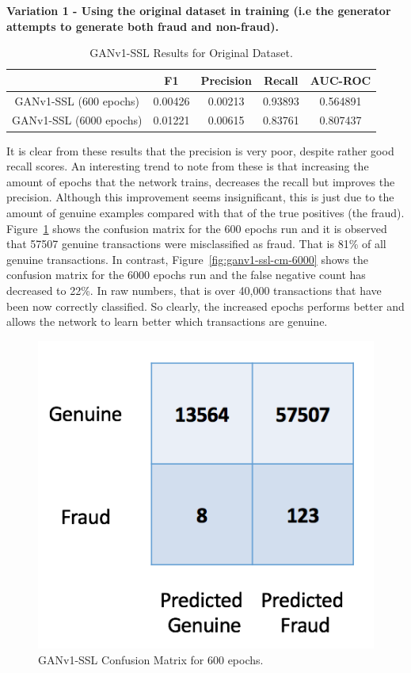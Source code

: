 \documentclass[12pt,a4paper,twoside]{report}
\begin{document}
\textbf{Variation 1 - Using the original dataset in training (i.e the generator attempts to generate both fraud and non-fraud).}

\begin{table}[H]  
  \centering
  \begin{tabular}{ccccc}
    \toprule
           		& F1 & Precision & Recall & AUC-ROC \\ \midrule
    GANv1-SSL (600 epochs) & 0.00426  &  0.00213 & 0.93893  & 0.564891 \\
    GANv1-SSL (6000 epochs) & 0.01221   &   0.00615 & 0.83761 & 0.807437  \\
   
   \bottomrule
 \end{tabular}
 \caption{GANv1-SSL Results for Original Dataset.}
\label{table:ganv1-ssl-original}
\end{table}

It is clear from these results that the precision is very poor, despite rather good recall scores. An interesting trend to note from these is that increasing the amount of epochs that the network trains, decreases the recall but improves the precision. Although this improvement seems insignificant, this is just due to the amount of genuine examples compared with that of the true positives (the fraud). Figure~\ref{fig:ganv1-ssl-cm-600} shows the confusion matrix for the 600 epochs run and it is observed that 57507 genuine transactions were misclassified as fraud. That is 81\% of all genuine transactions. In contrast, Figure~\ref{fig:ganv1-ssl-cm-6000} shows the confusion matrix for the 6000 epochs run and the false negative count has decreased to 22\%. In raw numbers, that is over 40,000 transactions that have been now correctly classified. So clearly, the increased epochs performs better and allows the network to learn better which transactions are genuine. 

\begin{figure}[H]
\centering
\includegraphics[scale=0.6]{ganv1-ssl-cm-600}
\caption{GANv1-SSL Confusion Matrix for 600 epochs.}
\label{fig:ganv1-ssl-cm-600}
\end{figure}
\end{document}
